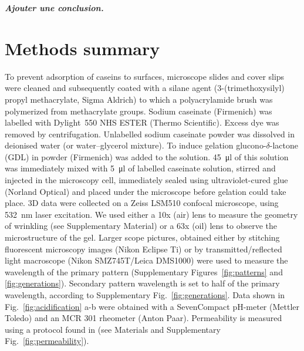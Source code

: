 \documentclass[twocolumn,superscriptaddress,showpacs,preprintnumbers,
amsmath,amssymb,prl]{revtex4-1}
\newcommand{\seb}[1]{\textbf{\color{blue}#1}} %
\begin{document}
\seb{\it Ajouter une conclusion.}

\section*{Methods summary}
To prevent adsorption of caseins to surfaces, microscope slides and cover slips were cleaned and subsequently coated with a silane agent (3-(trimethoxysilyl) propyl methacrylate, Sigma Aldrich) to which a polyacrylamide brush was polymerized from methacrylate groups.
Sodium caseinate (Firmenich) was labelled with Dylight~550 NHS ESTER (Thermo Scientific). Excess dye was removed by centrifugation. Unlabelled sodium caseinate powder was dissolved in deionised water (or water--glycerol mixture). To induce gelation glucono-$\delta$-lactone (GDL) in powder (Firmenich) was added to the solution. \SI{45}{\micro\litre} of this solution was immediately mixed with \SI{5}{\micro\litre} of labelled caseinate solution, stirred and injected in the microscopy cell, immediately sealed using ultraviolet-cured glue (Norland Optical) and placed under the microscope before gelation could take place. 
3D data were collected on a Zeiss LSM510 confocal microscope, using \SI{532}{\nano\meter} laser excitation. We used either a 10x (air) lens to measure the geometry of wrinkling (see Supplementary Material) or a 63x (oil) lens to observe the microstructure of the gel. Larger scope pictures, obtained either by stitching fluorescent microscopy images (Nikon Eclipse Ti) or by transmitted/reflected light macroscope (Nikon SMZ745T/Leica DMS1000) were used to measure the wavelength of the primary pattern (Supplementary Figures~\ref{fig:patterns} and \ref{fig:generations}). Secondary pattern wavelength is set to half of the primary wavelength, according to Supplementary Fig.~\ref{fig:generations}.
Data shown in Fig.~\ref{fig:acidification} a-b were obtained with a SevenCompact pH-meter (Mettler Toledo) and an MCR 301 rheometer (Anton Paar).
Permeability is measured using a protocol found in \cite{VanDijk1986} (see Materials and Supplementary Fig.~\ref{fig:permeability}).



\end{document}
